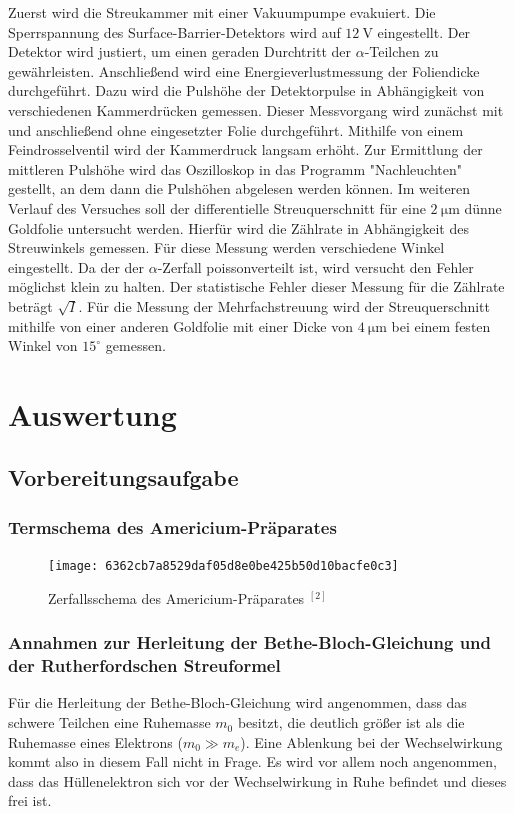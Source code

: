 \documentclass{article}
\begin{document}
Zuerst wird die Streukammer mit einer Vakuumpumpe evakuiert. Die Sperrspannung des Surface-Barrier-Detektors wird auf $\SI{12}{\volt}$ eingestellt. Der Detektor wird justiert, um einen geraden Durchtritt  der $\alpha$-Teilchen zu gewährleisten. Anschließend wird eine Energieverlustmessung der Foliendicke durchgeführt. Dazu wird die Pulshöhe der Detektorpulse in Abhängigkeit von verschiedenen Kammerdrücken gemessen. Dieser Messvorgang wird zunächst mit und anschließend ohne eingesetzter Folie durchgeführt. Mithilfe von einem Feindrosselventil wird der Kammerdruck langsam erhöht. Zur Ermittlung der mittleren Pulshöhe wird das Oszilloskop in das Programm "Nachleuchten" gestellt, an dem dann die Pulshöhen abgelesen werden können. Im weiteren Verlauf des Versuches soll der differentielle Streuquerschnitt für eine $\SI{2}{\micro\meter}$ dünne Goldfolie untersucht werden. Hierfür wird die Zählrate in Abhängigkeit des Streuwinkels gemessen. Für diese Messung werden verschiedene Winkel eingestellt. Da der der $\alpha$-Zerfall poissonverteilt ist, wird versucht den Fehler möglichst klein zu halten. Der statistische Fehler dieser Messung für die Zählrate beträgt $\sqrt{I}$. Für die Messung der Mehrfachstreuung wird der Streuquerschnitt mithilfe von einer anderen Goldfolie mit einer Dicke von $\SI{4}{\micro\meter}$ bei einem festen Winkel von $15 ^\circ$ gemessen.



	
\section{Auswertung}


\subsection{Vorbereitungsaufgabe}
\subsubsection{Termschema des Americium-Präparates}
\begin{figure}[h!]
	\centering
	\texttt{[image: 6362cb7a8529daf05d8e0be425b50d10bacfe0c3]}
	\caption{Zerfallsschema des Americium-Präparates $^{[2]}$}
	
\end{figure}
\subsubsection{Annahmen zur Herleitung der Bethe-Bloch-Gleichung und der Rutherfordschen Streuformel}
Für die Herleitung der Bethe-Bloch-Gleichung wird angenommen, dass das schwere Teilchen eine Ruhemasse $m_0$ besitzt, die deutlich größer ist als die Ruhemasse eines Elektrons ($m_0 \gg m_e$). Eine Ablenkung bei der Wechselwirkung kommt also in diesem Fall nicht in Frage. Es wird vor allem noch angenommen, dass das Hüllenelektron sich vor der Wechselwirkung in Ruhe befindet und dieses frei ist.
\end{document}
